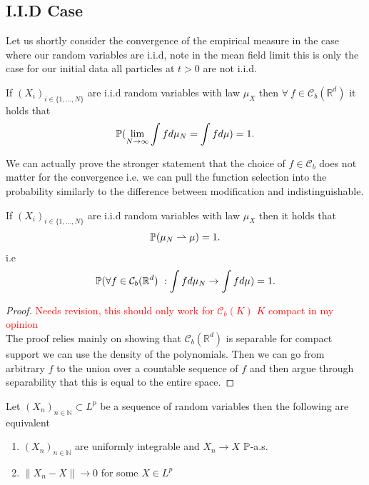 \subsection{I.I.D Case}
Let us shortly consider the convergence of the empirical measure in the case where our random variables are i.i.d, note in the mean field limit 
this is only the case for our initial data all particles at $t>0$ are not i.i.d.
\begin{corollary}
  If  $(X_i)_{i \in  \{1,\ldots ,N\}  }$ are i.i.d random variables with law $\mu_{X}$ then  $\forall  \ f \in  \mathcal{C}_b(\mathbb{R}^{d} ) $ it holds that
  \begin{align*}
    \P(\lim_{N \to \infty} \int  f d \mu_N = \int f d\mu ) = 1
  .\end{align*}
\end{corollary}
We can actually prove the stronger statement that the choice of $f \in  \mathcal{C}_b$ does not matter for the convergence i.e.
we can pull the function selection into the probability similarly to the difference between modification and indistinguishable. 
\begin{corollary}
  If  $(X_i)_{i \in  \{1,\ldots ,N\}  }$ are i.i.d random variables with law $\mu_{X}$ then  it holds that
\begin{align*}
  \P(\mu_N \rightharpoonup \mu ) = 1
.\end{align*}
i.e 
\begin{align*}
 \P( \forall  f \in  \mathcal{C}_b(\mathbb{R}^{d} ) \ : \int f d\mu_N \to  \int  f d\mu )  = 1
.\end{align*}
\end{corollary}
\begin{proof}
  \textcolor{Red}{Needs revision, this should only work for $\mathcal{C}_b(K)$ $K$ compact in my opinion}\\
 The proof relies mainly on showing that $\mathcal{C}_b(\mathbb{R}^{d} )$  is separable for compact support 
 we can use the density of the polynomials. Then we can go from arbitrary $f$ to the union over a countable sequence of $f$ 
 and then argue through separability that this is equal to the entire space.
\end{proof}
\newpage
\begin{lemma}\label{general_dct}
  Let $(X_n)_{n \in  \mathbb{N}} \subset   L^{p} $ be a sequence of random variables then the following are equivalent 
  \begin{enumerate}
    \item $(X_n)_{n \in  \mathbb{N}}$ are uniformly integrable  and $X_n \to X$ $\P$-a.s.
    \item $\|X_n - X\| \to  0$ for some $X \in  L^p$
  \end{enumerate}
\end{lemma}
